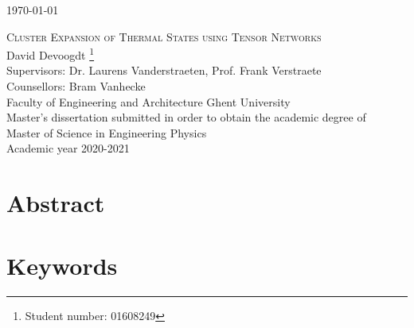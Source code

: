 \documentclass{book}
\newcounter{a}
\newcounter{b}
\begin{document}
\today


\newpage



%

\begin{center}

    \Large{\textsc{Cluster Expansion of Thermal States using Tensor
            Networks}} \\  [0.2cm]

    David Devoogdt \footnote{Student number: 01608249 }\\ [0.3cm]

    \normalsize{Supervisors: Dr. Laurens Vanderstraeten, Prof. Frank Verstraete} \\
    \normalsize{Counsellors: Bram Vanhecke} \\ [0.2cm]
    Faculty of Engineering and Architecture Ghent University\\[0.2cm]
    \small{Master's dissertation submitted in order to obtain the academic degree of \\
        Master of Science in Engineering Physics} \\ [0.2cm]
    \normalsize{Academic year 2020-2021} \\  %

\end{center}


\section*{Abstract}




\section*{Keywords}
\end{document}
